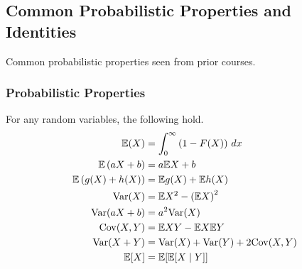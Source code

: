 \subsection*{Common Probabilistic Properties and Identities}

Common probabilistic properties seen from prior courses.

\subsubsection*{Probabilistic Properties}
For any random variables, the following hold.
\begin{align}
    \Em (X)                               & = \int_{0}^{\infty} \left( 1 - F(X) \right) \, dx                                                                                                              \\
    \Em \left( aX + b \right)             & = a \Em X + b                                                                                                                                                  \\
    \Em \left( g(X) + h(X) \right)        & = \Em g(X) + \Em h (X)                                                                                                                                         \\
    \Var (X)                              & = \Em X^2 - \left( \Em X \right)^2                                                                                                                             \\
    \Var (aX + b)                         & = a^2 \Var (X)                                                                                                                                                 \\
    \Cov (X,Y)                            & = \Em XY - \Em X \Em Y                                                                                                                                         \\
    \Var (X + Y)                          & = \Var (X) + \Var (Y) + 2 \Cov (X,Y)                                                                                                                           \\
    \Em [X]                               & = \Em [ \Em [X \mid Y] ]                                                                                                                                       \\

\end{align}
